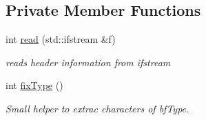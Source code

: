 \subsection*{Private Member Functions}
\begin{DoxyCompactItemize}
\item 
int \mbox{\hyperlink{classBitmapHeader_aebc19bf8a908f1f7edfc5b10186c9db8}{read}} (std\+::ifstream \&f)
\begin{DoxyCompactList}\small\item\em reads header information from ifstream \end{DoxyCompactList}\item 
int \mbox{\hyperlink{classBitmapHeader_aa02e59db95074c6a96a44dac03cee77b}{fix\+Type}} ()
\begin{DoxyCompactList}\small\item\em Small helper to extrac characters of bf\+Type. \end{DoxyCompactList}\end{DoxyCompactItemize}
